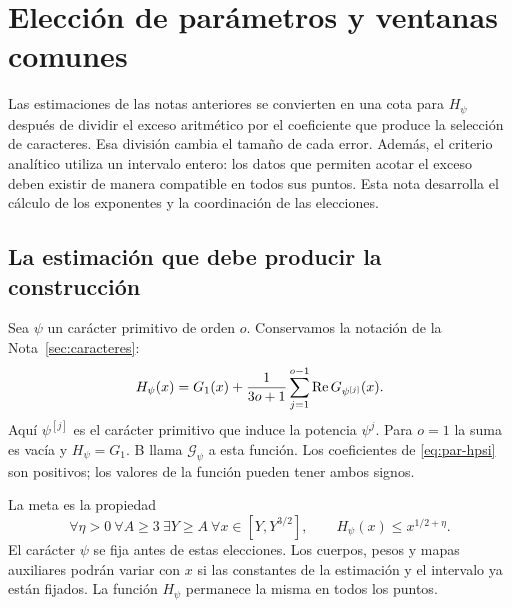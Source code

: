 \section{Elección de parámetros y ventanas comunes}
\label{sec:parametros}

Las estimaciones de las notas anteriores se convierten en una cota para
$H_\psi$ después de dividir el exceso aritmético por el coeficiente que
produce la selección de caracteres. Esa división cambia el tamaño de
cada error. Además, el criterio analítico utiliza un intervalo entero:
los datos que permiten acotar el exceso deben existir de manera compatible
en todos sus puntos. Esta nota desarrolla el cálculo de los exponentes
y la coordinación de las elecciones.


\subsection{La estimación que debe producir la construcción}

Sea $\psi$ un carácter primitivo de orden $o$. Conservamos la notación
de la Nota~\ref{sec:caracteres}:
\begin{equation}
 H_\psi(x)=G_1(x)+\frac{1}{3o+1}
       \sum_{j=1}^{o-1}\operatorname{Re} G_{\psi^{[j]}}(x).
 \label{eq:par-hpsi}
\end{equation}
Aquí $\psi^{[j]}$ es el carácter primitivo que induce la potencia
$\psi^j$. Para $o=1$ la suma es vacía y $H_\psi=G_1$.
B llama $\mathcal G_\psi$ a esta función. Los coeficientes de
\eqref{eq:par-hpsi} son positivos; los valores de la función pueden
tener ambos signos.

La meta es la propiedad
\begin{equation}
 \forall\eta>0\ \forall A\ge3\ \exists Y\ge A\
 \forall x\in[Y,Y^{3/2}],\qquad H_\psi(x)\le x^{1/2+\eta}.
 \label{eq:par-meta}
\end{equation}
El carácter $\psi$ se fija antes de estas elecciones. Los cuerpos,
pesos y mapas auxiliares podrán variar con $x$ si las constantes de la
estimación y el intervalo ya están fijados. La función $H_\psi$ permanece
la misma en todos los puntos.

